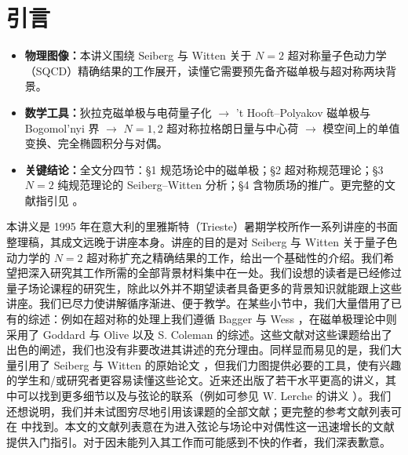 \section*{引言}

\begin{keypoints}
\begin{itemize}
  \item \textbf{物理图像：}本讲义围绕 Seiberg 与 Witten 关于 $N=2$ 超对称量子色动力学（SQCD）精确结果的工作展开，读懂它需要预先备齐磁单极与超对称两块背景。
  \item \textbf{数学工具：}狄拉克磁单极与电荷量子化 $\to$ 't Hooft–Polyakov 磁单极与 Bogomol'nyi 界 $\to$ $N=1,2$ 超对称拉格朗日量与中心荷 $\to$ 模空间上的单值变换、完全椭圆积分与对偶。
  \item \textbf{关键结论：}全文分四节：§1 规范场论中的磁单极；§2 超对称规范理论；§3 $N=2$ 纯规范理论的 Seiberg–Witten 分析；§4 含物质场的推广。更完整的文献指引见 \cite{Lerche}。
\end{itemize}
\end{keypoints}

本讲义是 1995 年在意大利的里雅斯特（Trieste）暑期学校所作一系列讲座的书面整理稿，其成文远晚于讲座本身。讲座的目的是对 Seiberg 与 Witten 关于量子色动力学的 $N=2$ 超对称扩充之精确结果的工作，给出一个基础性的介绍。我们希望把深入研究其工作所需的全部背景材料集中在一处。我们设想的读者是已经修过量子场论课程的研究生，除此以外并不期望读者具备更多的背景知识就能跟上这些讲座。我们已尽力使讲解循序渐进、便于教学。在某些小节中，我们大量借用了已有的综述：例如在超对称的处理上我们遵循 Bagger 与 Wess \cite{WB}，在磁单极理论中则采用了 Goddard 与 Olive \cite{GO} 以及 S. Coleman \cite{coleman1,coleman2} 的综述。这些文献对这些课题给出了出色的阐述，我们也没有非要改进其讲述的充分理由。同样显而易见的是，我们大量引用了 Seiberg 与 Witten 的原始论文 \cite{SW-I,SW2}，但我们力图提供必要的工具，使有兴趣的学生和/或研究者更容易读懂这些论文。近来还出版了若干水平更高的讲义，其中可以找到更多细节以及与弦论的联系（例如可参见 W. Lerche 的讲义 \cite{Lerche}）。我们还想说明，我们并未试图穷尽地引用该课题的全部文献；更完整的参考文献列表可在 \cite{Lerche} 中找到。本文的文献列表意在为进入弦论与场论中对偶性这一迅速增长的文献提供入门指引。对于因未能列入其工作而可能感到不快的作者，我们深表歉意。


